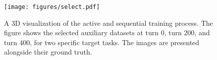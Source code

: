 \begin{figure}[!]
\vspace{-0.1cm}
    \centering
    \texttt{[image: figures/select.pdf]}
    \vspace{-0.6cm}
    \caption{A 3D visualization of the active and sequential training process. The figure shows the selected auxiliary datasets at turn 0, turn 200, and turn 400, for two specific target tasks. The images are presented alongside their ground truth.
    }
    \label{selection}
    \vspace{-0.5cm}
\end{figure}